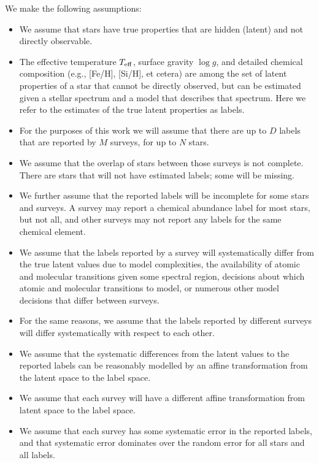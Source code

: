 \documentclass[twocolumn]{aastex61}
\newcommand\teff{T_{\rm eff}}
\newcommand\logg{\log{g}}
\begin{document}
We make the following assumptions:

\begin{itemize}
  \item We assume that stars have true properties that are hidden (latent) and
	 	not directly observable.
  \item The effective temperature $\teff$, surface gravity $\logg$, and detailed
  	    chemical composition (e.g., [Fe/H], [Si/H], et cetera) are among the set
	    of latent properties of a star that cannot be directly observed, but can 
	    be estimated given a stellar spectrum and a model that describes that 
	    spectrum. Here we refer to the estimates of the true latent properties
	    as labels.
  \item For the purposes of this work we will assume that there are up to $D$
  	    labels that are reported by $M$ surveys, for up to $N$ stars.
  \item We assume that the overlap of stars between those surveys is not complete.
  		There are stars that will not have estimated labels; some will be missing.
  \item We further assume that the reported labels will be incomplete for some
	    stars and surveys. A survey may report a chemical abundance label for 
	    most stars, but not all, and other surveys may not report any labels for
	    the same chemical element.
  \item We assume that the labels reported by a survey will systematically differ
  		from the true latent values due to model complexities, the availability 
		of atomic and molecular transitions given some spectral region, decisions 
		about which atomic and molecular transitions to model, or numerous other
		model decisions that differ between surveys.
  \item For the same reasons, we assume that the labels reported by different
  	    surveys will differ systematically with respect to each other.
  \item We assume that the systematic differences from the latent values to the
  		reported labels can be reasonably modelled by an affine transformation
		from the latent space to the label space.
  \item We assume that each survey will have a different affine transformation 
  		from latent space to the label space.
  \item We assume that each survey has some systematic error in the reported
  		labels, and that systematic error dominates over the random error for
		all stars and all labels.

\end{itemize}
\end{document}
